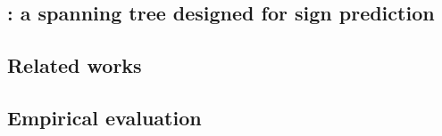 \subsection{\gtx{}: a spanning tree designed for sign prediction}
\label{sub:gtx_a_simple_low_stretch_tree_construction}



\subsection{Related works}
\label{sub:gtx_related_works}



\subsection{Empirical evaluation}
\label{sub:gtx_empirical_evaluation}



